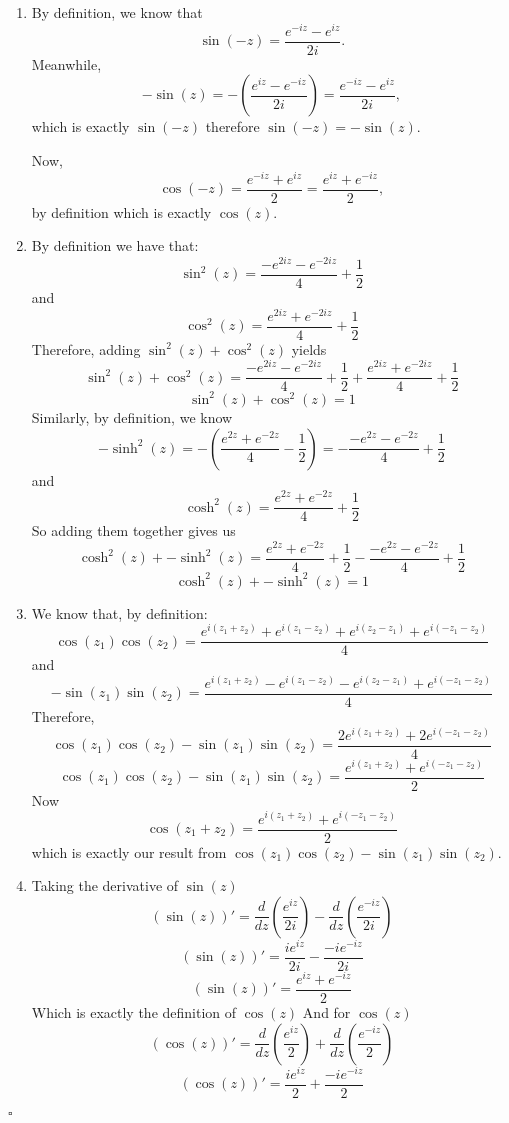 \documentclass[12pt]{article}
\newenvironment{proof}{\noindent{\bf Proof.}}{\hfill $\square$\medskip}
\begin{document}
\begin{proof}
\begin{enumerate}[label=\textbf{(\alph*)}]
    \item By definition, we know that
    $$\sin(-z)=\frac{e^{-iz}-e^{iz}}{2i}.$$
    Meanwhile,
    $$-\sin(z)=-\left(\frac{e^{iz}-e^{-iz}}{2i}\right)=\frac{e^{-iz}-e^{iz}}{2i},$$
    which is exactly $\sin(-z)$ therefore $\sin(-z)=-\sin(z)$.

    Now,
    $$\cos(-z)=\frac{e^{-iz}+e^{iz}}{2}=\frac{e^{iz}+e^{-iz}}{2},$$
    by definition which is exactly $\cos(z)$.
    \item By definition we have that:
    $$\sin^{2}(z)=\frac{-e^{2iz}-e^{-2iz}}{4}+\frac{1}{2}$$
    and
    $$\cos^{2}(z)=\frac{e^{2iz}+e^{-2iz}}{4}+\frac{1}{2}$$
    Therefore, adding $\sin^{2}(z)+\cos^{2}(z)$ yields
    $$\sin^{2}(z)+\cos^{2}(z)=\frac{-e^{2iz}-e^{-2iz}}{4}+\frac{1}{2}+\frac{e^{2iz}+e^{-2iz}}{4}+\frac{1}{2}$$
    $$\sin^{2}(z)+\cos^{2}(z)=1$$
    Similarly, by definition, we know
    $$-\sinh^{2}(z)=-\left(\frac{e^{2z}+e^{-2z}}{4}-\frac{1}{2}\right)=-\frac{-e^{2z}-e^{-2z}}{4}+\frac{1}{2}$$
    and
    $$\cosh^{2}(z)=\frac{e^{2z}+e^{-2z}}{4}+\frac{1}{2}$$
    So adding them together gives us
    $$\cosh^{2}(z)+-\sinh^{2}(z)=\frac{e^{2z}+e^{-2z}}{4}+\frac{1}{2}-\frac{-e^{2z}-e^{-2z}}{4}+\frac{1}{2}$$
    $$\cosh^{2}(z)+-\sinh^{2}(z)=1$$
    \item We know that, by definition:
    $$\cos(z_{1})\cos(z_{2})=\frac{e^{i(z_{1}+z_{2})}+e^{i(z_{1}-z_{2})}+e^{i(z_{2}-z_{1})}+e^{i(-z_{1}-z_{2})}}{4}$$
    and
    $$-\sin(z_{1})\sin(z_{2})=\frac{e^{i(z_{1}+z_{2})}-e^{i(z_{1}-z_{2})}-e^{i(z_{2}-z_{1})}+e^{i(-z_{1}-z_{2})}}{4}$$
    Therefore,
    $$\cos(z_{1})\cos(z_{2})-\sin(z_{1})\sin(z_{2})=\frac{2e^{i(z_{1}+z_{2})}+2e^{i(-z_{1}-z_{2})}}{4}$$
    $$\cos(z_{1})\cos(z_{2})-\sin(z_{1})\sin(z_{2})=\frac{e^{i(z_{1}+z_{2})}+e^{i(-z_{1}-z_{2})}}{2}$$
    Now
    $$\cos(z_{1}+z_{2})=\frac{e^{i(z_{1}+z_{2})}+e^{i(-z_{1}-z_{2})}}{2}$$
    which is exactly our result from $\cos(z_{1})\cos(z_{2})-\sin(z_{1})\sin(z_{2})$.
    \item Taking the derivative of $\sin(z)$
    $$(\sin(z))'=\frac{d}{dz}\left(\frac{e^{iz}}{2i}\right)-\frac{d}{dz}\left(\frac{e^{-iz}}{2i}\right)$$
    $$(\sin(z))'=\frac{ie^{iz}}{2i}-\frac{-ie^{-iz}}{2i}$$
    $$(\sin(z))'=\frac{e^{iz}+e^{-iz}}{2}$$
    Which is exactly the definition of $\cos(z)$
    And for $\cos(z)$
    $$(\cos(z))'=\frac{d}{dz}\left(\frac{e^{iz}}{2}\right)+\frac{d}{dz}\left(\frac{e^{-iz}}{2}\right)$$
    $$(\cos(z))'=\frac{ie^{iz}}{2}+\frac{-ie^{-iz}}{2}$$

\end{enumerate}
\end{proof}
\end{document}
